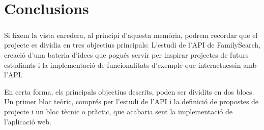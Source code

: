 \chapter{Conclusions}

    \paragraph{}
    Si fixem la vista enredera, al principi d’aquesta memòria, podrem recordar que el projecte es dividia en tres objectius principals: L’estudi de l’API de FamilySearch, creació d’una bateria d’idees que pogués servir per inspirar projectes de futurs estudiants i la implementació de funcionalitats d’exemple que interactuessin amb l’API.

    En certa forma, els principals objectius descrits, poden ser dividits en dos blocs. Un primer bloc teòric, comprés per l’estudi de l’API i la definició de propostes de projecte i un bloc tècnic o pràctic, que acabaria sent la implementació de l’aplicació web.

    
    
    

